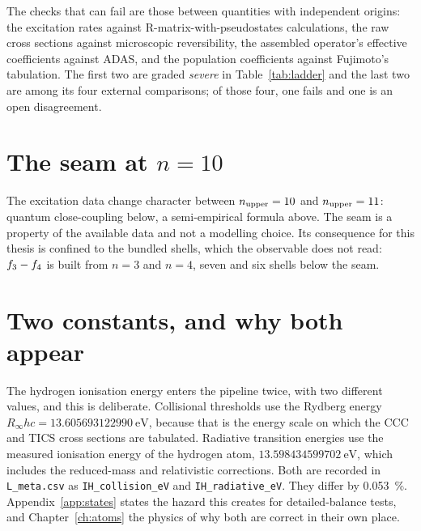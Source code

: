 The checks that can fail are those between quantities with independent origins:
the excitation rates against R-matrix-with-pseudostates calculations, the raw
cross sections against microscopic reversibility, the assembled operator's
effective coefficients against ADAS, and the population coefficients against
Fujimoto's tabulation. The first two are graded \emph{severe} in
Table~\ref{tab:ladder} and the last two are among its four external
comparisons; of those four, one fails and one is an open disagreement.

\section{The seam at \texorpdfstring{$n = 10$}{n = 10}}

The excitation data change character between $n_{\rm upper} = 10$ and
$n_{\rm upper} = 11$: quantum close-coupling below, a semi-empirical formula
above. The seam is a property of the available data and not a modelling choice.
Its consequence for this thesis is confined to the bundled shells, which the
observable does not read: $f_{3}-f_{4}$ is built from $n = 3$ and
$n = 4$, seven and six shells below the seam.

\section{Two constants, and why both appear}

The hydrogen ionisation energy enters the pipeline twice, with two different
values, and this is deliberate. Collisional thresholds use the Rydberg energy
$R_\infty hc = \SI{13.605693122990}{\electronvolt}$, because that is the energy
scale on which the CCC and TICS cross sections are tabulated. Radiative
transition energies use the measured ionisation energy of the hydrogen atom,
$\SI{13.598434599702}{\electronvolt}$, which includes the reduced-mass and
relativistic corrections. Both are recorded in \texttt{L\_meta.csv} as
\texttt{IH\_collision\_eV} and \texttt{IH\_radiative\_eV}. They differ by
\SI{0.053}{\percent}. Appendix~\ref{app:states} states the hazard this creates for
detailed-balance tests, and Chapter~\ref{ch:atoms} the physics of why both are
correct in their own place.
